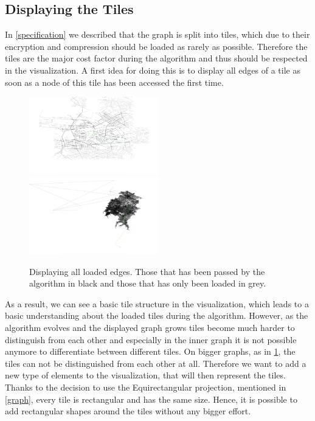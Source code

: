 \documentclass
[
	paper = a4,
    pagesize,
	12 pt,
	oneside,                       %
    open = right,
	DIV = calc,
	BCOR = 0 mm,                   %
	bibtotoc
]
{scrbook}
\begin{document}
\subsection{Displaying the Tiles} \label{tiles}

In \cref{specification} we described that the graph is split into tiles, which due to their encryption and compression should be loaded as rarely as possible.
Therefore the tiles are the major cost factor during the algorithm and thus should be respected in the visualization.
A first idea for doing this is to display all edges of a tile as soon as a node of this tile has been accessed the first time.

\begin{figure}[H]
    \includegraphics[width=0.5\textwidth]{Images/vis-tile-blocks-small.png}
    \includegraphics[width=0.5\textwidth]{Images/vis-tile-blocks-big.png}
\caption[]{Displaying all loaded edges. Those that has been passed by the algorithm in black and those that has only been loaded in grey.}
\label{fig:basic_tiles}
\end{figure}

As a result, we can see a basic tile structure in the visualization, which leads to a basic understanding about the loaded tiles during the algorithm.
However, as the algorithm evolves and the displayed graph grows tiles become much harder to distinguish from each other and especially in the inner graph it is not possible anymore to differentiate between different tiles.
On bigger graphs, as in \cref{fig:basic_tiles}, the tiles can not be distinguished from each other at all.
Therefore we want to add a new type of elements to the visualization, that will then represent the tiles.
Thanks to the decision to use the Equirectangular projection, mentioned in \cref{graph}, every tile is rectangular and has the same size.
Hence, it is possible to add rectangular shapes around the tiles without any bigger effort.
\end{document}
